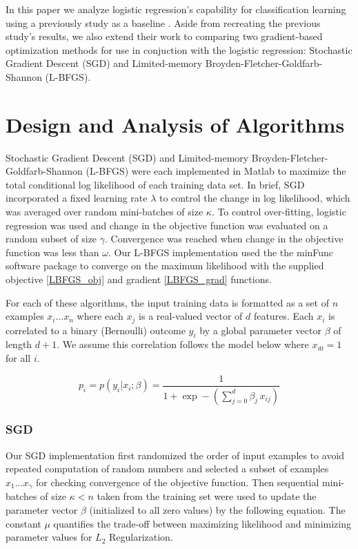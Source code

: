 \documentclass[10pt]{article}
\begin{document}
In this paper we analyze logistic regression's capability for classification learning using a previously study as a baseline \cite{t-logistic}. Aside from recreating the previous study's results, we also extend their work to comparing two gradient-based optimization methods for use in conjuction with the logistic regression: Stochastic Gradient Descent (SGD) and Limited-memory Broyden-Fletcher-Goldfarb-Shannon (L-BFGS).



\section{Design and Analysis of Algorithms}
\label{sec:algorithms}

Stochastic Gradient Descent (SGD) and Limited-memory Broyden-Fletcher-Goldfarb-Shannon (L-BFGS) were each implemented in Matlab to maximize the total conditional log likelihood of each training data set. In brief, SGD incorporated a fixed learning rate $\lambda$ to control the change in log likelihood, which was averaged over random mini-batches of size $\kappa$. To control over-fitting, logistic regression was used and change in the objective function was evaluated on a random subset of size $\gamma$. Convergence was reached when change in the objective function was less than $\omega$. Our L-BFGS implementation used the the minFunc \cite{minFunc} software package to converge on the maximum likelihood with the supplied objective \ref{LBFGS_obj} and gradient \ref{LBFGS_grad} functions.

For each of these algorithms, the input training data is formatted as a set of $n$ examples $x_i \ldots x_n$ where each $x_j$ is a real-valued vector of $d$ features. Each $x_i$ is correlated to a binary (Bernoulli) outcome $y_i$ by a global parameter vector $\beta$ of length $d+1$. We assume this correlation follows the model below where $x_{i0}=1$ for all $i$.

\begin{equation}\label{p}
    p_i = p(y_i|x_i;\beta) = \frac{1}{1+\exp-(\sum_{j=0}^{d} \beta_j\,x_{ij})}
\end{equation}



\subsubsection{SGD} 
Our SGD implementation first randomized the order of input examples to avoid repeated computation of random numbers and selected a subset of examples $x_1 \ldots x_{\gamma}$ for checking convergence of the objective function. Then sequential mini-batches of size $\kappa < n$ taken from the training set were used to update the parameter vector $\beta$ (initialized to all zero values) by the following equation. The constant $\mu$ quantifies the trade-off between maximizing likelihood and minimizing parameter values for $L_2$ Regularization.
\end{document}
